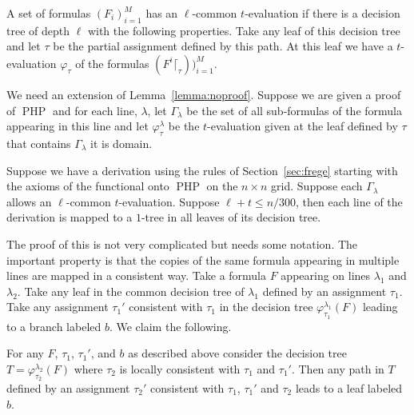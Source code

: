 \documentclass{theoretics}
\DeclareMathOperator{\PHP}{PHP}
\begin{document}
\begin{definition}
A set of formulas $(F_i)_{i=1}^M$ has an $\ell$-common $t$-evaluation if
there is a decision tree of depth $\ell$ with
the following properties.  Take any leaf of this decision
tree and let $\tau$ be the partial assignment defined by
this path.  At this leaf we have a $t$-evaluation
$\varphi_{\tau}$ of the formulas $(F^i\lceil_{\tau}))_{i=1}^M$.
\end{definition}

We need an extension of Lemma~\ref{lemma:noproof}.
Suppose we are given a proof of $\PHP$ and for each line,
$\lambda$, let $\Gamma_\lambda$ be the set of all sub-formulas
of the formula appearing in this line and let $\varphi_{\tau}^{\lambda}$
be the $t$-evaluation given at the leaf defined by 
$\tau$ that contains $\Gamma_\lambda$ it is domain.

\begin{lemma}\label{lemma:noproofm}
Suppose we have a derivation using the rules
of Section~\ref{sec:frege} starting with the
axioms of the functional onto $\PHP$ on the $n \times n$ grid.
Suppose each $\Gamma_\lambda$ allows an $\ell$-common $t$-evaluation.
Suppose $\ell +t \leq n/300$, then
each line of the derivation is mapped to a $1$-tree
in all leaves of its decision tree.
\end{lemma}

The proof of this is not very complicated but needs some
notation.  The important property is
that the copies of the same formula appearing in multiple lines
are mapped in a consistent way.  Take a formula
$F$ appearing on lines $\lambda_1$ and $\lambda_2$.
Take any leaf in the common decision tree of 
$\lambda_1$ defined by an assignment $\tau_1$.
Take any assignment $\tau_1'$ consistent with $\tau_1$ in
the decision tree $\varphi_{\tau_1}^{\lambda_1} (F)$ leading
to a branch labeled $b$.  We claim the following.

\begin{lemma}\label{lemma:consteval}
For any $F$, $\tau_1$, $\tau_1'$, and $b$ as described above consider the
decision tree $T=\varphi_{\tau_2}^{\lambda_2} (F)$ 
where $\tau_2$ is locally consistent with $\tau_1$
and $\tau_1'$.  Then any path in $T$ defined
by an assignment $\tau_2'$ consistent with
$\tau_1$, $\tau_1'$ and $\tau_2$ leads to
a leaf labeled $b$.
\end{lemma}
\end{document}
